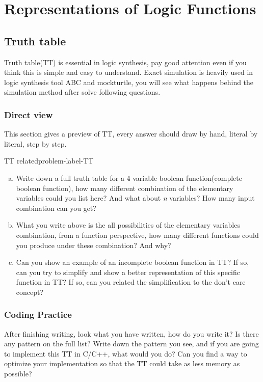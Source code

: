 \documentclass[main.tex]{subfiles}
\begin{document}
\section{Representations of Logic Functions}
\subsection{Truth table}
Truth table(TT) is essential in logic synthesis, pay good attention even if you think this is simple and easy to understand. Exact simulation is heavily used in logic synthesis tool ABC and mockturtle, you will see what happens behind the simulation method after solve following questions.

\subsubsection{Direct view}
This section gives a preview of TT, every answer should draw by hand, literal by literal, step by step.
\begin{problem}{TT related}{problem-label-TT}
\begin{enumerate}[(a)]
    \item Write down a full truth table for a 4 variable boolean function(complete boolean function), how many different combination of the elementary variables could you list here? And what about \emph{n} variables? How many input combination can you get?
    
    \item What you write above is the all possibilities of the elementary variables combination, from a function perspective, how many different functions could you produce under these combination? And why?

    \item Can you show an example of an incomplete boolean function in TT? If so, can you try to simplify and show a better representation of this specific function in TT? If so, can you related the simplification to the don't care concept?
\end{enumerate}
\end{problem}
\vspace*{4\baselineskip}
\subsubsection{Coding Practice}
After finishing writing, look what you have written, how do you write it? Is there any pattern on the full list? Write down the pattern you see, and if you are going to implement this TT in C/C++, what would you do? Can you find a way to optimize your implementation so that the TT could take as less memory as possible?
\end{document}

